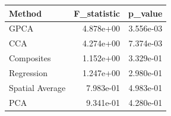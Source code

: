 \begin{tabular}{lrr}
\toprule
Method & F_statistic & p_value \\
\midrule
GPCA & 4.878e+00 & 3.556e-03 \\
CCA & 4.274e+00 & 7.374e-03 \\
Composites & 1.152e+00 & 3.329e-01 \\
Regression & 1.247e+00 & 2.980e-01 \\
Spatial Average & 7.983e-01 & 4.983e-01 \\
PCA & 9.341e-01 & 4.280e-01 \\
\bottomrule
\end{tabular}
